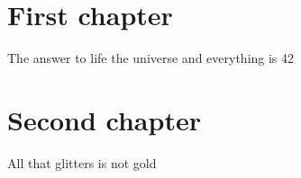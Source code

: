 \documentclass{report}
\begin{document}
\chapter{First chapter}

The answer to life the universe and everything is 42 


\chapter{Second chapter}

All that glitters is not gold \cite{Tolkien}



\end{document}
